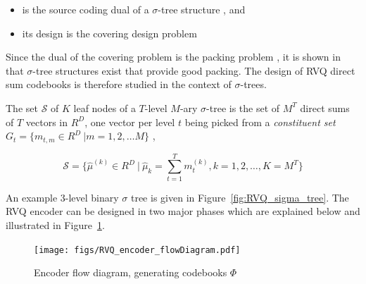 \begin{itemize}
\item is the source coding dual of a $\sigma$-tree structure \cite{1993_sigmaTrees_Barnes}, and
\item its design is the covering design problem
\end{itemize}

Since the dual of the covering problem is the packing problem \cite{BOOK_spheres_Conway}, it is shown in \cite{1993_sigmaTrees_Barnes} that $\sigma$-tree structures exist that provide good packing.  The design of RVQ direct sum codebooks is therefore studied in the context of $\sigma$-trees.

The set $\mathcal{S}$ of $K$ leaf nodes of a $T$-level $M$-ary $\sigma$-tree is the set of $M^T$ direct sums of $T$ vectors in $R^D$, one vector per level $t$ being picked from a \emph{constituent set} $G_t = \{m_{t,m} \in R^D \ | m=1, 2, \ldots M\}$ \cite{2002_JNL_SigmaTrees_Barnes},

\begin{equation}
\mathcal{S} = \{\hat{\mu}^{(k)} \in R^D \ | \ \hat{\mu}_k = \sum\limits_{t=1}^T m_t^{(k)}, k=1, 2, \ldots, K=M^T\}
\end{equation}

An example 3-level binary $\sigma$ tree is given in Figure~\ref{fig:RVQ_sigma_tree}.  The RVQ encoder can be designed in two major phases which are explained below and illustrated in Figure~\ref{fig:RVQ_encoder_flowDiagram}. 
 


 

\begin{figure}[ht]
\centering
\texttt{[image: figs/RVQ\_encoder\_flowDiagram.pdf]}
\caption{Encoder flow diagram, generating codebooks $\Phi$}
\label{fig:RVQ_encoder_flowDiagram}
\end{figure}


